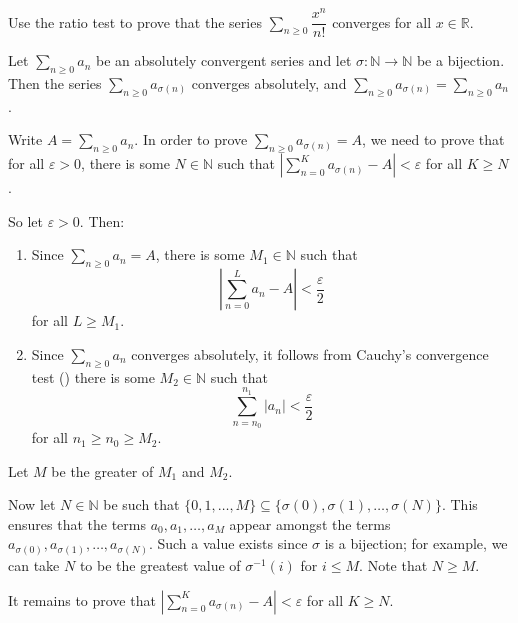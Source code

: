 \begin{exercise}
\label{exExponentialFunctionCoverges}
Use the ratio test to prove that the series $\sum_{n \ge 0} \dfrac{x^n}{n!}$ converges for all $x \in \mathbb{R}$.
\end{exercise}

\begin{theorem}
\label{thmIndependenceOfOrdering}
Let $\displaystyle \sum_{n \ge 0} a_n$ be an absolutely convergent series and let $\sigma : \mathbb{N} \to \mathbb{N}$ be a bijection. Then the series $\displaystyle \sum_{n \ge 0} a_{\sigma(n)}$ converges absolutely, and $\displaystyle \sum_{n \ge 0} a_{\sigma(n)} = \sum_{n \ge 0} a_n$.
\end{theorem}

\begin{cproof}
Write $A = \displaystyle \sum_{n \ge 0} a_n$. In order to prove $\displaystyle \sum_{n \ge 0} a_{\sigma(n)} = A$, we need to prove that for all $\varepsilon > 0$, there is some $N \in \mathbb{N}$ such that $\left| \displaystyle\sum_{n=0}^K a_{\sigma(n)} - A \right| < \varepsilon$ for all $K \ge N$.

So let $\varepsilon > 0$. Then:
\begin{enumerate}[(1)]
\item Since $\displaystyle \sum_{n \ge 0} a_n = A$, there is some $M_1 \in \mathbb{N}$ such that
\[ \left| \sum_{n=0}^L a_n - A \right| < \dfrac{\varepsilon}{2} \]
for all $L \ge M_1$.
\item Since $\displaystyle \sum_{n \ge 0} a_n$ converges absolutely, it follows from Cauchy's convergence test () there is some $M_2 \in \mathbb{N}$ such that
\[ \sum_{n=n_0}^{n_1} |a_n| < \dfrac{\varepsilon}{2} \]
for all $n_1 \ge n_0 \ge M_2$.
\end{enumerate}

Let $M$ be the greater of $M_1$ and $M_2$.

Now let $N \in \mathbb{N}$ be such that $\{ 0, 1, \dots, M \} \subseteq \{ \sigma(0), \sigma(1), \dots, \sigma(N) \}$. This ensures that the terms $a_0, a_1, \dots, a_M$ appear amongst the terms $a_{\sigma(0)}, a_{\sigma(1)}, \dots, a_{\sigma(N)}$. Such a value exists since $\sigma$ is a bijection; for example, we can take $N$ to be the greatest value of $\sigma^{-1}(i)$ for $i \le M$. 
Note that $N \ge M$.

It remains to prove that $\left| \displaystyle\sum_{n=0}^K a_{\sigma(n)} - A \right| < \varepsilon$ for all $K \ge N$.


\end{cproof}
